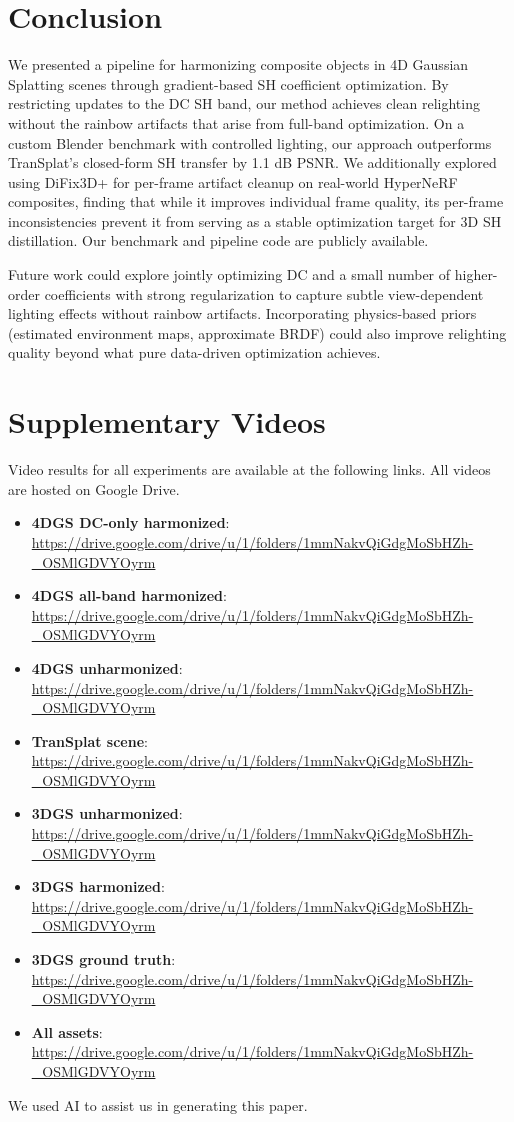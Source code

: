 \documentclass[10pt,twocolumn,letterpaper]{article}
\begin{document}
\section{Conclusion}

We presented a pipeline for harmonizing composite objects in 4D Gaussian Splatting scenes through gradient-based SH coefficient optimization. By restricting updates to the DC SH band, our method achieves clean relighting without the rainbow artifacts that arise from full-band optimization. On a custom Blender benchmark with controlled lighting, our approach outperforms TranSplat's closed-form SH transfer by 1.1 dB PSNR. We additionally explored using DiFix3D+ for per-frame artifact cleanup on real-world HyperNeRF composites, finding that while it improves individual frame quality, its per-frame inconsistencies prevent it from serving as a stable optimization target for 3D SH distillation. Our benchmark and pipeline code are publicly available.

Future work could explore jointly optimizing DC and a small number of higher-order coefficients with strong regularization to capture subtle view-dependent lighting effects without rainbow artifacts. Incorporating physics-based priors (estimated environment maps, approximate BRDF) could also improve relighting quality beyond what pure data-driven optimization achieves.

\section*{Supplementary Videos}

Video results for all experiments are available at the following links. All videos are hosted on Google Drive.

\begin{itemize}
\item \textbf{4DGS DC-only harmonized}: \url{https://drive.google.com/drive/u/1/folders/1mmNakvQiGdgMoSbHZh-_OSMlGDVYOyrm}
\item \textbf{4DGS all-band harmonized}: \url{https://drive.google.com/drive/u/1/folders/1mmNakvQiGdgMoSbHZh-_OSMlGDVYOyrm}
\item \textbf{4DGS unharmonized}: \url{https://drive.google.com/drive/u/1/folders/1mmNakvQiGdgMoSbHZh-_OSMlGDVYOyrm}
\item \textbf{TranSplat scene}: \url{https://drive.google.com/drive/u/1/folders/1mmNakvQiGdgMoSbHZh-_OSMlGDVYOyrm}
\item \textbf{3DGS unharmonized}: \url{https://drive.google.com/drive/u/1/folders/1mmNakvQiGdgMoSbHZh-_OSMlGDVYOyrm}
\item \textbf{3DGS harmonized}: \url{https://drive.google.com/drive/u/1/folders/1mmNakvQiGdgMoSbHZh-_OSMlGDVYOyrm}
\item \textbf{3DGS ground truth}: \url{https://drive.google.com/drive/u/1/folders/1mmNakvQiGdgMoSbHZh-_OSMlGDVYOyrm}
\item \textbf{All assets}: \url{https://drive.google.com/drive/u/1/folders/1mmNakvQiGdgMoSbHZh-_OSMlGDVYOyrm}
\end{itemize}

We used AI to assist us in generating this paper.

{\small


}
\end{document}
